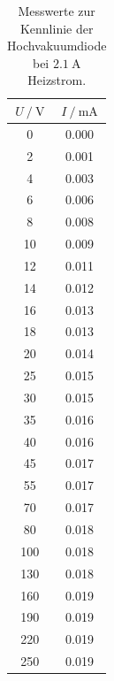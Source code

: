 \begin{table}
  \centering
  \caption{Messwerte zur Kennlinie der Hochvakuumdiode bei $\SI{2.1}{\ampere}$ Heizstrom.}
  \label{tab:a21tab}
  \begin{tabular}{S[table-format=3.0] S[table-format=1.3]}
    \toprule
    {$U \:/\: \si{\volt}$} & {$I \:/\: \si{\milli\ampere}$}\\
    	  &0.000 \\
    2	  &0.001 \\
    4	  &0.003 \\
    6	  &0.006 \\
    8	  &0.008 \\
    10  &	0.009 \\
    12  &	0.011 \\
    14  &	0.012 \\
    16  &	0.013 \\
    18  &	0.013 \\
    20  &	0.014 \\
    25  &	0.015 \\
    30  &	0.015 \\
    35  &	0.016 \\
    40  &	0.016 \\
    45  &	0.017 \\
    55  &	0.017 \\
    70  &	0.017 \\
    80  &	0.018 \\
    100 & 0.018 \\
    130 & 0.018 \\
    160 & 0.019 \\
    190 & 0.019 \\
    220 & 0.019 \\
    250 & 0.019  \\
  \end{tabular}
\end{table}

